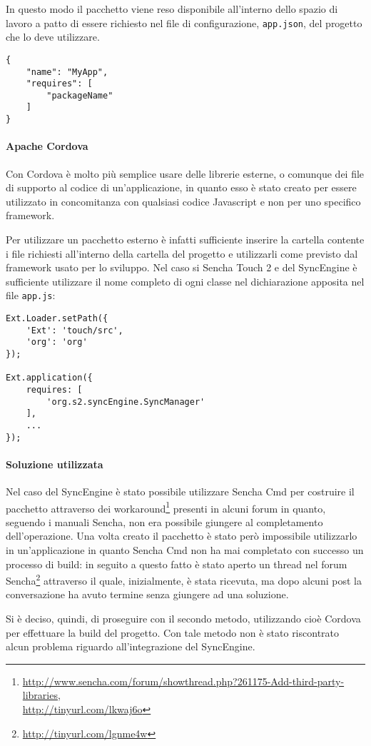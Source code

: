 In questo modo il pacchetto viene reso disponibile all'interno dello spazio di lavoro a patto di essere richiesto nel file di configurazione, \texttt{app.json}, del progetto che lo deve utilizzare.

\lstset{language=Java}
\begin{lstlisting}[caption={Inclusione di un pacchetto in un'applicazione - Sencha Touch 2}]
{
    "name": "MyApp",
    "requires": [
        "packageName"
    ]
}
\end{lstlisting}

\paragraph*{Apache Cordova}
Con Cordova è molto più semplice usare delle librerie esterne, o comunque dei file di supporto al codice di un'applicazione, in quanto esso è stato creato per essere utilizzato in concomitanza con qualsiasi codice Javascript e non per uno specifico framework.

Per utilizzare un pacchetto esterno è infatti sufficiente inserire la cartella contente i file richiesti all'interno della cartella del progetto e utilizzarli come previsto dal framework usato per lo sviluppo.
Nel caso si Sencha Touch 2 e del SyncEngine è sufficiente utilizzare il nome completo di ogni classe nel dichiarazione apposita nel file \texttt{app.js}:

\begin{lstlisting}[caption={Inclusione di un pacchetto in un'applicazione - Apache Cordova}]
Ext.Loader.setPath({
    'Ext': 'touch/src',
    'org': 'org'
});

Ext.application({
    requires: [
        'org.s2.syncEngine.SyncManager'
    ],
    ...
});
\end{lstlisting}

\paragraph*{Soluzione utilizzata}
Nel caso del SyncEngine è stato possibile utilizzare Sencha Cmd per costruire il pacchetto attraverso dei workaround\footnote{\url{http://www.sencha.com/forum/showthread.php?261175-Add-third-party-libraries},\\\url{http://tinyurl.com/lkwaj6o}} presenti in alcuni forum in quanto, seguendo i manuali Sencha, non era possibile giungere al completamento dell'operazione.
Una volta creato il pacchetto è stato però impossibile utilizzarlo in un'applicazione in quanto Sencha Cmd non ha mai completato con successo un processo di build: in seguito a questo fatto è stato aperto un thread nel forum Sencha\footnote{\url{http://tinyurl.com/lgnme4w}} attraverso il  quale, inizialmente, è stata ricevuta, ma dopo alcuni post la conversazione ha avuto termine senza giungere ad una soluzione.

Si è deciso, quindi, di proseguire con il secondo metodo, utilizzando cioè Cordova per effettuare la build del progetto.
Con tale metodo non è stato riscontrato alcun problema riguardo all'integrazione del SyncEngine.

